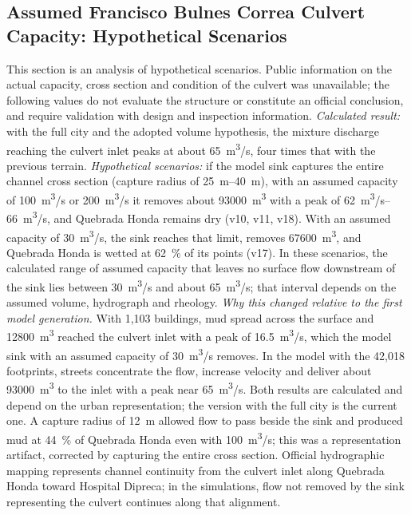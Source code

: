 \subsection{Assumed Francisco Bulnes Correa Culvert Capacity: Hypothetical Scenarios}\label{sec:res-colector}
This section is an analysis of hypothetical scenarios. Public information on the actual capacity, cross section and condition of the culvert was unavailable; the following values do not evaluate the structure or constitute an official conclusion, and require validation with design and inspection information. \emph{Calculated result:} with the full city and the adopted volume hypothesis, the mixture discharge reaching the culvert inlet peaks at about \SI{65}{m^3/s}, four times that with the previous terrain. \emph{Hypothetical scenarios:} if the model sink captures the entire channel cross section (capture radius of \SIrange{25}{40}{m}), with an assumed capacity of \SI{100}{m^3/s} or \SI{200}{m^3/s} it removes about \SI{93000}{m^3} with a peak of \SIrange{62}{66}{m^3/s}, and Quebrada Honda remains dry (v10, v11, v18). With an assumed capacity of \SI{30}{m^3/s}, the sink reaches that limit, removes \SI{67600}{m^3}, and Quebrada Honda is wetted at \SI{62}{\percent} of its points (v17). In these scenarios, the calculated range of assumed capacity that leaves no surface flow downstream of the sink lies between \SI{30}{m^3/s} and about \SI{65}{m^3/s}; that interval depends on the assumed volume, hydrograph and rheology. \emph{Why this changed relative to the first model generation.} With 1,103 buildings, mud spread across the surface and \SI{12800}{m^3} reached the culvert inlet with a peak of \SI{16.5}{m^3/s}, which the model sink with an assumed capacity of \SI{30}{m^3/s} removes. In the model with the 42,018 footprints, streets concentrate the flow, increase velocity and deliver about \SI{93000}{m^3} to the inlet with a peak near \SI{65}{m^3/s}. Both results are calculated and depend on the urban representation; the version with the full city is the current one. A capture radius of \SI{12}{m} allowed flow to pass beside the sink and produced mud at \SI{44}{\percent} of Quebrada Honda even with \SI{100}{m^3/s}; this was a representation artifact, corrected by capturing the entire cross section. Official hydrographic mapping represents channel continuity from the culvert inlet along Quebrada Honda toward Hospital Dipreca; in the simulations, flow not removed by the sink representing the culvert continues along that alignment.


